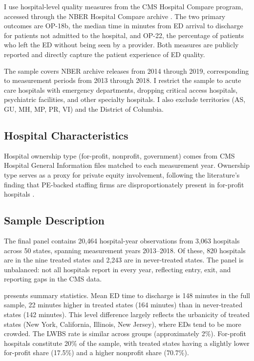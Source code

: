 \documentclass[12pt]{article}
\begin{document}
I use hospital-level quality measures from the CMS Hospital Compare program, accessed through the NBER Hospital Compare archive \citep{cms2023}. The two primary outcomes are OP-18b, the median time in minutes from ED arrival to discharge for patients not admitted to the hospital, and OP-22, the percentage of patients who left the ED without being seen by a provider. Both measures are publicly reported and directly capture the patient experience of ED quality.

The sample covers NBER archive releases from 2014 through 2019, corresponding to measurement periods from 2013 through 2018. I restrict the sample to acute care hospitals with emergency departments, dropping critical access hospitals, psychiatric facilities, and other specialty hospitals. I also exclude territories (AS, GU, MH, MP, PR, VI) and the District of Columbia.

\subsection{Hospital Characteristics}

Hospital ownership type (for-profit, nonprofit, government) comes from CMS Hospital General Information files matched to each measurement year. Ownership type serves as a proxy for private equity involvement, following the literature's finding that PE-backed staffing firms are disproportionately present in for-profit hospitals \citep{laPointe2023}.

\subsection{Sample Description}

The final panel contains 20,464 hospital-year observations from 3,063 hospitals across 50 states, spanning measurement years 2013--2018. Of these, 820 hospitals are in the nine treated states and 2,243 are in never-treated states. The panel is unbalanced: not all hospitals report in every year, reflecting entry, exit, and reporting gaps in the CMS data.



 presents summary statistics. Mean ED time to discharge is 148 minutes in the full sample, 22 minutes higher in treated states (164 minutes) than in never-treated states (142 minutes). This level difference largely reflects the urbanicity of treated states (New York, California, Illinois, New Jersey), where EDs tend to be more crowded. The LWBS rate is similar across groups (approximately 2\%). For-profit hospitals constitute 20\% of the sample, with treated states having a slightly lower for-profit share (17.5\%) and a higher nonprofit share (70.7\%).
\end{document}
